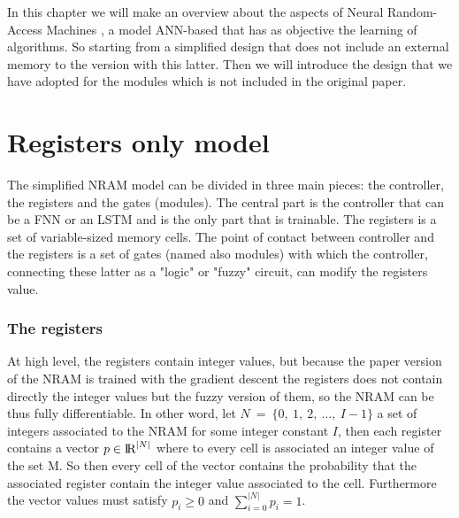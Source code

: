 In this chapter we will make an overview about the aspects of Neural Random-Access Machines \cite{NRAM:2015}, a model ANN-based that has as objective the learning of algorithms. So starting from a simplified design that does not include an external memory to the version with this latter. Then we will introduce the design that we have adopted for the modules which is not included in the original paper. 


\section{Registers only model}
The simplified NRAM model can be divided in three main pieces: the controller, the registers and the gates (modules). The central part is the controller that can be a FNN or an LSTM and is the only part that is trainable. The registers is a set of variable-sized memory cells. The point of contact between controller and the registers is a set of gates (named also modules) with which the controller, connecting these latter as a "logic" or "fuzzy" circuit, can modify the registers value. 

\subsubsection*{The registers}
At high level, the registers contain integer values, but because the paper version of the NRAM is trained with the gradient descent the registers does not contain directly the integer values but the fuzzy version of them, so the NRAM can be thus fully differentiable. In other word, let $N\ =\ \{0,\ 1,\ 2,\ \dots,\ I - 1\}$ a set of integers associated to the NRAM for some integer constant $I$, then each register contains a vector $p \in \textrm{I\!R}^{|N|}$ where to every cell is associated an integer value of the set M. So then every cell of the vector contains the probability that the associated register contain the integer value associated to the cell. Furthermore the vector values must satisfy $p_{i} \geq 0$ and $\sum\limits_{i = 0}^{|N|} p_{i} = 1$.

